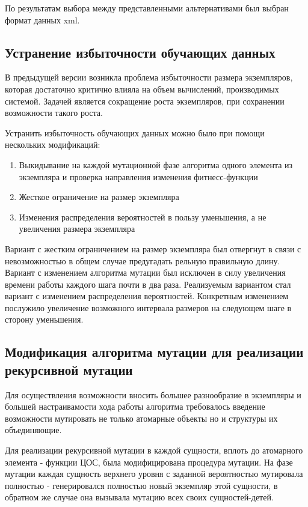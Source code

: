 \documentclass[utf8,usehyperref,12pt]{G7-32}
\begin{document}
По результатам выбора между представленными альтернативами был выбран формат данных xml.

\subsection{Устранение избыточности обучающих данных}
В предыдущей версии возникла проблема избыточности размера экземпляров, которая достаточно критично влияла на объем  вычислений, производимых системой. Задачей является сокращение роста экземпляров, при сохранении возможности такого роста.

Устранить избыточность обучающих данных можно было при помощи нескольких модификаций:
\begin{enumerate}
\item Выкидывание на каждой мутационной фазе алгоритма одного элемента из экземпляра и проверка направления изменения фитнесс-функции
\item Жесткое ограничение на размер экземпляра
\item Изменения распределения вероятностей в пользу уменьшения, а не увеличения размера экземпляра
\end{enumerate}
Вариант с жестким ограничением на размер экземпляра был отвергнут в связи с невозможностью в общем случае предугадать рельную правильную длину. Вариант с изменением алгоритма мутации был исключен в силу увеличения времени работы каждого шага почти в два раза. Реализуемым вариантом стал вариант с изменением распределения вероятностей. Конкретным изменением послужило увеличение возможного интервала размеров на следующем шаге в сторону уменьшения.

\subsection{Модификация алгоритма мутации для реализации рекурсивной мутации}
Для осуществления возможности вносить большее разнообразие в экземпляры и большей настраивамости хода работы алгоритма требовалось введение возможности мутировать не только атомарные объекты но и структуры их объединяющие.

Для реализации рекурсивной мутации в каждой сущности, вплоть до атомарного элемента - функции ЦОС, была модифицирована процедура мутации. На фазе мутации каждая сущность верхнего уровня с заданной вероятностью мутировала полностью - генерировался полностью новый экземпляр этой сущности, в обратном же случае она вызывала мутацию всех своих сущностей-детей.
\end{document}
